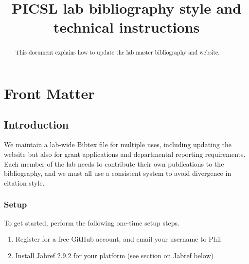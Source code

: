 \documentclass{InsightArticle}
\title{PICSL lab bibliography style and technical instructions}
\begin{document}
%
% 


\ifpdf
\else
\fi


\maketitle


\ifhtml
\chapter*{Front Matter\label{front}}
\fi



\begin{abstract}
\noindent This document explains how to update the lab master bibliography and website.
\end{abstract}

\tableofcontents
\newpage

\section{Introduction}

We maintain a lab-wide Bibtex file for multiple uses, including updating the website but also for grant applications and departmental reporting requirements. Each member of the lab needs to contribute their own publications to the bibliography, and we must all use a consistent system to avoid divergence in citation style.

\subsection{Setup}

To get started, perform the following one-time setup steps.

\begin{enumerate}
\item Register for a free GitHub account, and email your username to Phil
\item Install Jabref 2.9.2 for your platform (see section on Jabref below)
\end{enumerate}
\end{document}

